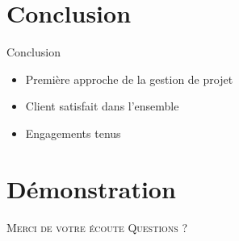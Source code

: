 \documentclass{cubeamer}
\begin{document}
\section{Conclusion}

\begin{frame}{Conclusion}
    \begin{itemize}
        \item Première approche de la gestion de projet 
        \item Client satisfait dans l'ensemble
        \item Engagements tenus
    \end{itemize}
\end{frame}

\section{Démonstration}

\begin{frame}[standout]
    \Huge\textsc{Merci de votre écoute}
    \vfill
    \LARGE\textsc{Questions ?}
\end{frame}
\end{document}
